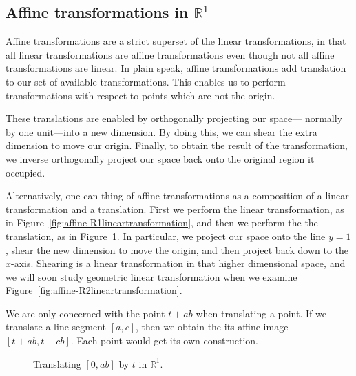 \subsection{Affine transformations in \texorpdfstring{\(\mathbb{R}^{1}\)}{R1}}

Affine transformations are a strict superset of the linear
transformations, in that all linear transformations are affine
transformations even though not all affine transformations are
linear. In plain speak, affine transformations add translation
to our set of available transformations. This enables us to perform
transformations with respect to points which are not the origin.

These translations are enabled by orthogonally projecting our space---%
normally by one unit---into a new dimension. By doing this, we can
shear the extra dimension to move our origin. Finally, to obtain the
result of the transformation, we inverse orthogonally project our space
back onto the original region it occupied.

Alternatively, one can thing of affine transformations as a 
composition of a linear transformation and a translation.
First we perform the linear transformation, as in 
Figure~\ref{fig:affine-R1lineartransformation}, and then we 
perform the the translation, as in Figure~\ref{fig:affine-R1translation}. 
In particular, we project our space onto the line \(y=1\), shear the 
new dimension to move the origin, and then project back down to the \(x\)-axis.
Shearing is a linear transformation in that higher dimensional space, and 
we will soon study geometric linear transformation when we examine 
Figure~\ref{fig:affine-R2lineartransformation}.
\begin{remark}
    We are only concerned with the point \(t+ab\) when translating a point.
    If we translate a line segment \([a,c]\), then we obtain 
    the its affine image \([t+ab,t+cb]\). Each point would get its own 
    construction.
\end{remark}

\begin{figure}
    \centering
    \caption{Translating \([0,ab]\) by \(t\) in \(\mathbb{R}^{1}\).}
    \label{fig:affine-R1translation}
\end{figure}

